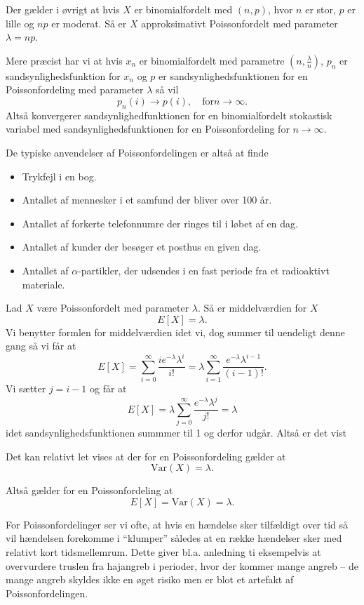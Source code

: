 Der gælder i øvrigt at hvis $X$ er binomialfordelt med $(n,p)$, hvor $n$ er stor, $p$ er lille og $np$ er moderat. Så er $X$ approksimativt Poissonfordelt med parameter $\lambda = np$.

Mere præcist har vi at hvis $x_n$ er binomialfordelt med parametre $(n, \frac{\lambda}{n})$, $p_n$ er sandsynlighedsfunktion for $x_n$ og $p$ er sandsynlighedsfunktionen for en Poissonfordeling med parameter $\lambda$ så vil
\[ 
p_n(i) \to p(i), \quad \text{for} n \to \infty  
.\]
Altså konvergerer sandsynlighedfunktionen for en binomialfordelt stokastisk variabel med sandsynlighedsfunktionen for en Poissonfordeling for $n \to \infty$.

De typiske anvendelser af Poissonfordelingen er altså at finde
\begin{itemize}
  \item Trykfejl i en bog.
  \item Antallet af mennesker i et samfund der bliver over 100 år.
  \item Antallet af forkerte telefonnumre der ringes til i løbet af en dag.
  \item Antallet af kunder der besøger et posthus en given dag.
  \item Antallet af $\alpha$-partikler, der udsendes i en fast periode fra et radioaktivt materiale.
\end{itemize}

\begin{sæt}
  Lad $X$ være Poissonfordelt med parameter $\lambda$. Så er middelværdien for $X$
  \[ 
    E[X] = \lambda
  .\]
  \tcblower
  Vi benytter formlen for middelværdien idet vi, dog summer til uendeligt denne gang så vi får at
  \[ 
    E[X] = \sum_{i = 0}^{\infty} \frac{ie^{-\lambda}\lambda^{i}}{i!} = \lambda \sum_{i = 1}^{\infty} \frac{e^{-\lambda}\lambda^{i-1}}{(i-1)!}
  .\]
  Vi sætter $j = i-1$ og får at
  \[ 
    E[X] = \lambda \sum_{j = 0}^{\infty} \frac{e^{-\lambda}\lambda^{j}}{j!} = \lambda
  \]
  idet sandsynlighedsfunktionen summmer til 1 og derfor udgår. Altså er det vist
\end{sæt}

\begin{sæt}
  Det kan relativt let vises at der for en Poissonfordeling gælder at
  \[ 
    \mathrm{Var}(X) = \lambda
  .\]
\end{sæt}

Altså gælder for en Poissonfordeling at
\[ 
  E[X] = \mathrm{Var}(X) = \lambda
.\]

For Poissonfordelinger ser vi ofte, at hvis en hændelse sker tilfældigt over tid så vil hændelsen forekomme i ``klumper'' således at en række hændelser sker med relativt kort tidsmellemrum. Dette giver bl.a. anledning ti eksempelvis at overvurdere truslen fra hajangreb i perioder, hvor der kommer mange angreb -- de mange angreb skyldes ikke en øget risiko men er blot et artefakt af Poissonfordelingen.
